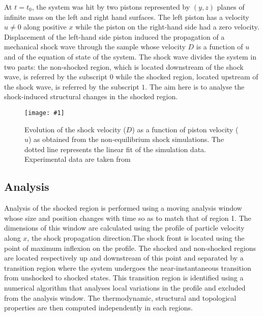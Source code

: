 \documentclass[aps,10pt,twocolumn]{revtex4}
\newlength{\picW}	%
\newcommand{\picA}{270}	%
\newcommand{\picL}[1]{\texttt{[image: \#1]}}
\begin{document}
At $t=t_0$, the system was hit by two pistons represented by $(y,z)$ planes of infinite mass on
the left and right hand surfaces. The left piston has a velocity $u \neq 0$ along positive $x$ while
the piston on the right-hand side had a zero velocity. Displacement of the left-hand side piston
induced the propagation of a mechanical shock wave through the sample whose velocity $D$ is a
function of $u$ and of the equation of state of the system. The shock wave divides the system in
two parts: the non-shocked region, which is located downstream of the shock wave, is referred by the
subscript $0$ while the shocked region, located upstream of the shock wave, is referred by the 
subscript $1$. The aim here is to analyse the shock-induced structural changes in the shocked
region.\\ 


\picW=8cm
\begin{figure}
\picL{fig05.ps}
\caption{Evolution of the shock velocity ($D$) as a function of
piston velocity ($u$) as obtained from the non-equilibrium shock simulations.  The dotted line
represents the linear fit of the simulation data. Experimental data are taken from~\cite{SugiuraKondo81}}
\label{fig:shock_D-u}
\end{figure}



\subsection{Analysis}

Analysis of the shocked region is performed using a moving analysis window whose size and position
changes with time so as to match that of region 1. The dimensions of this 
window are calculated using the profile of particle velocity along $x$, the 
shock propagation direction.The shock front is located using the point of maximum inflexion on
the profile. The shocked and non-shocked regions are located respectively up and downstream of
this point and separated by a transition region where the system undergoes the
near-instantaneous transition from unshocked to shocked states. This transition region is
identified using a numerical algorithm that analyses local variations in the profile and excluded
from the analysis window. The thermodynamic, structural and topological properties are then
computed independently in each regions.\\ 
\end{document}
